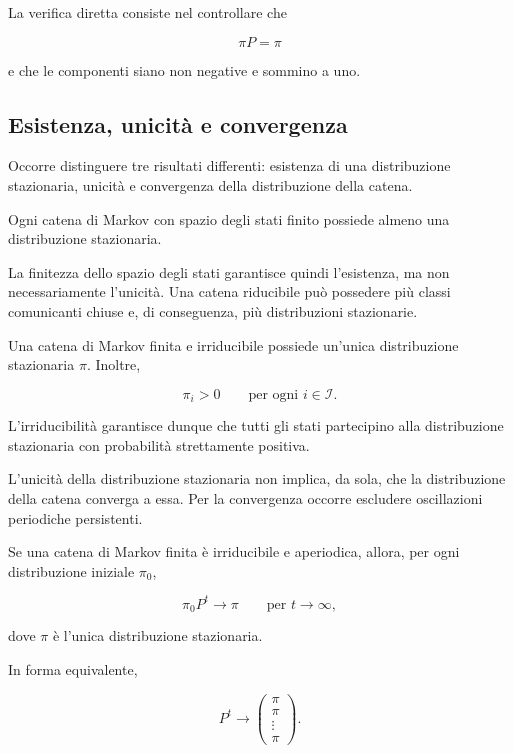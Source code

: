 La verifica diretta consiste nel controllare che

\[
\pi P=\pi
\]

e che le componenti siano non negative e sommino a uno.

\subsection{Esistenza, unicit\`{a} e convergenza}

Occorre distinguere tre risultati differenti: esistenza di una
distribuzione stazionaria, unicit\`{a} e convergenza della distribuzione
della catena.

\begin{proposition}
Ogni catena di Markov con spazio degli stati finito possiede almeno una
distribuzione stazionaria.
\end{proposition}

La finitezza dello spazio degli stati garantisce quindi l'esistenza, ma
non necessariamente l'unicit\`{a}. Una catena riducibile pu\`{o}
possedere pi\`{u} classi comunicanti chiuse e, di conseguenza, pi\`{u}
distribuzioni stazionarie.

\begin{theorem}
Una catena di Markov finita e irriducibile possiede un'unica
distribuzione stazionaria \(\pi\). Inoltre,

\[
\pi_i>0
\qquad
\text{per ogni }i\in\mathcal{I}.
\]
\end{theorem}

L'irriducibilit\`{a} garantisce dunque che tutti gli stati partecipino
alla distribuzione stazionaria con probabilit\`{a} strettamente
positiva.

L'unicit\`{a} della distribuzione stazionaria non implica, da sola, che
la distribuzione della catena converga a essa. Per la convergenza
occorre escludere oscillazioni periodiche persistenti.

\begin{theorem}
Se una catena di Markov finita \`{e} irriducibile e aperiodica, allora,
per ogni distribuzione iniziale \(\pi_0\),

\[
\pi_0P^t\longrightarrow\pi
\qquad
\text{per }t\longrightarrow\infty,
\]

dove \(\pi\) \`{e} l'unica distribuzione stazionaria.
\end{theorem}

In forma equivalente,

\[
P^t
\longrightarrow
\begin{pmatrix}
\pi\\
\pi\\
\vdots\\
\pi
\end{pmatrix}.
\]


